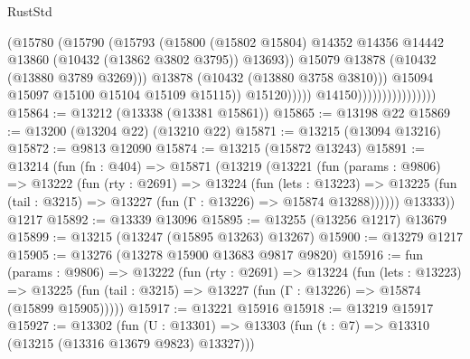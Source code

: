 \begin{lexlean}{RustStd}
\begin{coremodule}
                                                  (@15780
                                                    (@15790
                                                      (@15793
                                                        (@15800
                                                          (@15802 @15804)
                                                          @14352
                                                          @14356
                                                          @14442
                                                          @13860
                                                          (@10432 (@13862 @3802 @3795))
                                                          @13693))
                                                      @15079
                                                      @13878
                                                      (@10432 (@13880 @3789 @3269)))
                                                    @13878
                                                    (@10432 (@13880 @3758 @3810)))
                                                  @15094
                                                  @15097
                                                  @15100
                                                  @15104
                                                  @15109
                                                  @15115))
                                              @15120)))))
                                    @14150))))))))))))))))
@15864 := @13212 (@13338 (@13381 @15861))
@15865 := @13198 @22
@15869 := @13200 (@13204 @22) (@13210 @22)
@15871 := @13215 (@13094 @13216)
@15872 := @9813 @12090
@15874 := @13215 (@15872 @13243)
@15891 := @13214
    (fun (fn : @404) =>
    @15871
      (@13219
        (@13221
          (fun (params : @9806) =>
          @13222
            (fun (rty : @2691) =>
            @13224
              (fun (lets : @13223) =>
              @13225 (fun (tail : @3215) => @13227 (fun (Γ : @13226) => @15874 @13288))))))
        @13333))
    @1217
@15892 := @13339 @13096
@15895 := @13255 (@13256 @1217) @13679
@15899 := @13215 (@13247 (@15895 @13263) @13267)
@15900 := @13279 @1217
@15905 := @13276 (@13278 @15900 @13683 @9817 @9820)
@15916 := fun (params : @9806) =>
  @13222
    (fun (rty : @2691) =>
    @13224
      (fun (lets : @13223) =>
      @13225 (fun (tail : @3215) => @13227 (fun (Γ : @13226) => @15874 (@15899 @15905)))))
@15917 := @13221 @15916
@15918 := @13219 @15917
@15927 := @13302
    (fun (U : @13301) => @13303 (fun (t : @7) => @13310 (@13215 (@13316 @13679 @9823) @13327)))

\end{coremodule}
\end{lexlean}
